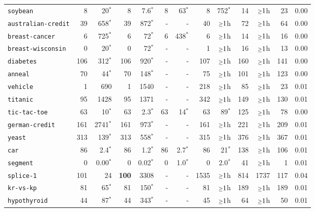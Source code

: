 \begin{tabular}{lrrrrrrrrrrrr}
\texttt{soybean} & 8 & 20$^*$ & 8 & 7.6$^*$ & 8 & 63$^*$ & 8 & 752$^*$ & 14 & $\mathsmaller{\geq}1$h & 23 & 0.00\\
\texttt{australian-credit} & 39 & 658$^*$ & 39 & 872$^*$ & - & - & 40 & $\mathsmaller{\geq}1$h & 72 & $\mathsmaller{\geq}1$h & 64 & 0.00\\
\texttt{breast-cancer} & 6 & 725$^*$ & 6 & 72$^*$ & 6 & 438$^*$ & 6 & $\mathsmaller{\geq}1$h & 14 & $\mathsmaller{\geq}1$h & 16 & 0.00\\
\texttt{breast-wisconsin} & 0 & 20$^*$ & 0 & 72$^*$ & - & - & 1 & $\mathsmaller{\geq}1$h & 16 & $\mathsmaller{\geq}1$h & 13 & 0.00\\
\texttt{diabetes} & 106 & 312$^*$ & 106 & 920$^*$ & - & - & 107 & $\mathsmaller{\geq}1$h & 160 & $\mathsmaller{\geq}1$h & 141 & 0.00\\
\texttt{anneal} & 70 & 44$^*$ & 70 & 148$^*$ & - & - & 75 & $\mathsmaller{\geq}1$h & 101 & $\mathsmaller{\geq}1$h & 123 & 0.00\\
\texttt{vehicle} & 1 & 690 & 1 & 1540 & - & - & 218 & $\mathsmaller{\geq}1$h & 85 & $\mathsmaller{\geq}1$h & 23 & 0.01\\
\texttt{titanic} & 95 & 1428 & 95 & 1371 & - & - & 342 & $\mathsmaller{\geq}1$h & 149 & $\mathsmaller{\geq}1$h & 130 & 0.01\\
\texttt{tic-tac-toe} & 63 & 10$^*$ & 63 & 2.3$^*$ & 63 & 14$^*$ & 63 & 89$^*$ & 125 & $\mathsmaller{\geq}1$h & 78 & 0.00\\
\texttt{german-credit} & 161 & 2741$^*$ & 161 & 973$^*$ & - & - & 161 & $\mathsmaller{\geq}1$h & 221 & $\mathsmaller{\geq}1$h & 209 & 0.01\\
\texttt{yeast} & 313 & 139$^*$ & 313 & 558$^*$ & - & - & 315 & $\mathsmaller{\geq}1$h & 376 & $\mathsmaller{\geq}1$h & 367 & 0.01\\
\texttt{car} & 86 & 2.4$^*$ & 86 & 1.2$^*$ & 86 & 2.7$^*$ & 86 & 21$^*$ & 138 & $\mathsmaller{\geq}1$h & 106 & 0.01\\
\texttt{segment} & 0 & 0.00$^*$ & 0 & 0.02$^*$ & 0 & 1.0$^*$ & 0 & 2.0$^*$ & 41 & $\mathsmaller{\geq}1$h & 1 & 0.01\\
\texttt{splice-1} & 101 & 24 & \textbf{100} & 3308 & - & - & 1535 & $\mathsmaller{\geq}1$h & 814 & 1737 & 117 & 0.04\\
\texttt{kr-vs-kp} & 81 & 65$^*$ & 81 & 150$^*$ & - & - & 81 & $\mathsmaller{\geq}1$h & 189 & $\mathsmaller{\geq}1$h & 189 & 0.01\\
\texttt{hypothyroid} & 44 & 87$^*$ & 44 & 343$^*$ & - & - & 45 & $\mathsmaller{\geq}1$h & 64 & $\mathsmaller{\geq}1$h & 50 & 0.01\\

\end{tabular}
